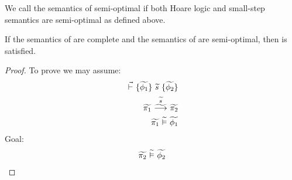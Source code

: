 We call the semantics of \gvl semi-optimal if both Hoare logic and small-step semantics are semi-optimal as defined above.

\begin{theorem}
    \label{thm:compl-and-so-to-gdpres}
    If the semantics of \svl are complete and the semantics of \gvl are semi-optimal, then  is satisfied.
\end{theorem}
\begin{proof}
    To prove  we may assume:
    \begin{align}
    \label{frm:tmp0}
    \dgthoare{}{\grad{\phi_1}}{\grad{s}}{\grad{\phi_2}}\\
    \label{frm:tmp1}
    \gsstepConsume{\grad{s}}{\grad{\pi_1}}{\grad{\pi_2}}\\
    \label{frm:tmp2}
    \evalgphiGen{\grad{\pi_1}}{\grad{\phi_1}}
    \end{align}
    Goal: 
    \begin{align}
    \label{frm:tmp3}
    \evalgphiGen{\grad{\pi_2}}{\grad{\phi_2}}
    \end{align}
    

\end{proof}
